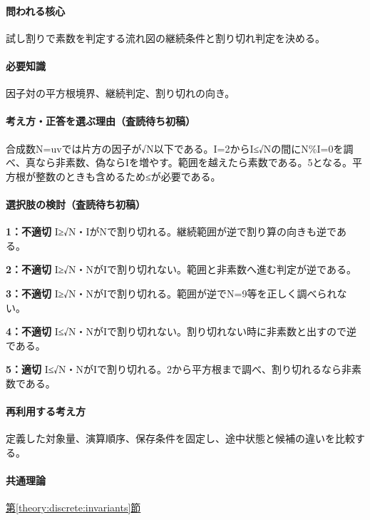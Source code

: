 \paragraph{問われる核心} 試し割りで素数を判定する流れ図の継続条件と割り切れ判定を決める。

\paragraph{必要知識} 因子対の平方根境界、継続判定、割り切れの向き。

\paragraph{考え方・正答を選ぶ理由（査読待ち初稿）} 合成数N=\allowbreak{}uvでは片方の因子が√N以下である。I=\allowbreak{}2からI≤√Nの間にN\%I=\allowbreak{}0を調べ、真なら非素数、偽ならIを増やす。範囲を越えたら素数である。5となる。平方根が整数のときも含めるため≤が必要である。

\paragraph{選択肢の検討（査読待ち初稿）}\mbox{}\par

\noindent\textbf{1：不適切} I≥√N・IがNで割り切れる。継続範囲が逆で割り算の向きも逆である。\par

\noindent\textbf{2：不適切} I≥√N・NがIで割り切れない。範囲と非素数へ進む判定が逆である。\par

\noindent\textbf{3：不適切} I≥√N・NがIで割り切れる。範囲が逆でN=\allowbreak{}9等を正しく調べられない。\par

\noindent\textbf{4：不適切} I≤√N・NがIで割り切れない。割り切れない時に非素数と出すので逆である。\par

\noindent\textbf{5：適切} I≤√N・NがIで割り切れる。2から平方根まで調べ、割り切れるなら非素数である。\par

\paragraph{再利用する考え方} 定義した対象量、演算順序、保存条件を固定し、途中状態と候補の違いを比較する。

\paragraph{共通理論} \hyperref[theory:discrete:invariants]{第\ref*{theory:discrete:invariants}節}

